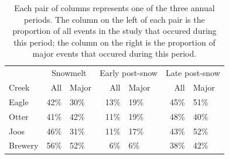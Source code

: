 \documentclass[12pt]{article}
\begin{document}
\begin{table}[h]
    \begin{center}
    \begin{tabular}{lr|lr|lr|l}
        & \multicolumn{2}{c}{Snowmelt    }\ & \multicolumn{2}{c}{Early post-snow}\ & \multicolumn{2}{c}{Late post-snow} \\
        Creek & All & Major & All & Major & All & Major \\
        \hline 
        Eagle & 42\% & 30\% & 13\% & 19\% & 45\% & 51\% \\
        Otter & 41\% & 42\% & 11\% & 19\% & 48\% & 40\% \\
        Joos & 46\% & 31\% & 11\% & 17\% & 43\% & 52\% \\
        
        Brewery & 56\% & 52\% & 6\% & 6\% & 38\% & 42\% \\
        
    \end{tabular}
    \end{center}
    \caption{Each pair of columns represents one of the three annual periods. The column on the left of each pair is the proportion of all events in the study that occured during this period; the column on the right is the proportion of major events that occured during this period. \label{proportion_of_majors}}
\end{table}
\end{document}
